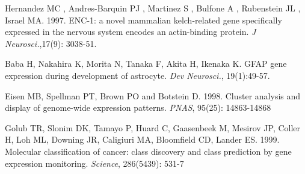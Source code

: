 \documentclass[10pt,letterpaper]{article}
\begin{document}

\clearpage

\begin{thebibliography}{9}

%
%



Hernandez MC , Andres-Barquin PJ , Martinez S , Bulfone A , Rubenstein JL , Israel MA. 1997.
ENC-1: a novel mammalian kelch-related gene specifically expressed in the nervous system encodes an actin-binding protein.
\textit{J Neurosci.},17(9): 3038-51.

Baba H, Nakahira K, Morita N, Tanaka F, Akita H, Ikenaka K.
GFAP gene expression during development of astrocyte.
\textit{Dev Neurosci.}, 19(1):49-57.

Eisen MB, Spellman PT, Brown PO and Botstein D. 1998.
Cluster analysis and display of genome-wide expression patterns.
\textit{PNAS}, 95(25): 14863-14868

Golub TR, Slonim DK, Tamayo P, Huard C, Gaasenbeek M, Mesirov JP, Coller H, Loh ML, Downing JR, Caligiuri MA, Bloomfield CD, Lander ES. 1999.
Molecular classification of cancer: class discovery and class prediction by gene expression monitoring.
\textit{Science}, 286(5439): 531-7


\end{thebibliography}
\end{document}
